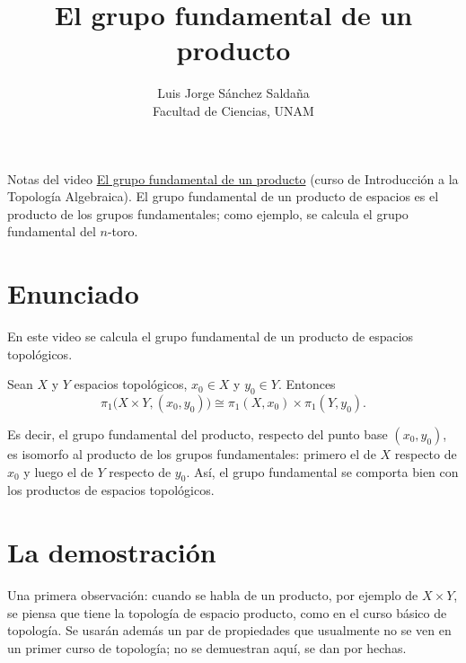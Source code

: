 \documentclass[11pt]{article}
\title{El grupo fundamental de un producto}
\author{Luis Jorge Sánchez Saldaña\\[2pt]\small Facultad de Ciencias, UNAM}
\date{}
\begin{document}
\maketitle

\noindent\small Notas del video
\href{https://www.youtube.com/watch?v=lvDPAcjvnvE}{\guillemotleft{}El grupo fundamental de un producto\guillemotright{}}
(curso de Introducción a la Topología Algebraica). El grupo fundamental de un producto de espacios es el producto de los grupos fundamentales; como ejemplo, se calcula el grupo fundamental del $n$-toro.
\normalsize

\section*{Enunciado}

En este video se calcula el grupo fundamental de un producto de espacios topológicos.

\begin{teo}\label{teo:producto}
Sean $X$ y $Y$ espacios topológicos, $x_0\in X$ y $y_0\in Y$. Entonces
\[
  \pi_1\bigl(X\times Y,(x_0,y_0)\bigr)\cong\pi_1(X,x_0)\times\pi_1(Y,y_0).
\]
\end{teo}

Es decir, el grupo fundamental del producto, respecto del punto base $(x_0,y_0)$, es isomorfo al producto de los grupos fundamentales: primero el de $X$ respecto de $x_0$ y luego el de $Y$ respecto de $y_0$. Así, el grupo fundamental se comporta bien con los productos de espacios topológicos.

\section*{La demostración}

Una primera observación: cuando se habla de un producto, por ejemplo de $X\times Y$, se piensa que tiene la topología de espacio producto, como en el curso básico de topología. Se usarán además un par de propiedades que usualmente no se ven en un primer curso de topología; no se demuestran aquí, se dan por hechas.
\end{document}
